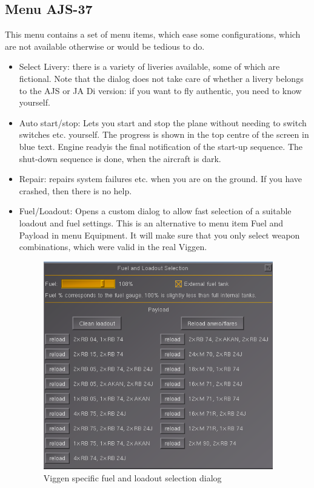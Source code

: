 \subsection{Menu AJS-37}
This menu contains a set of menu items, which ease some configurations, which are not available otherwise or would be tedious to do.
\begin{itemize}
\item Select Livery: there is a variety of liveries available, some of which are fictional. Note that the dialog does not take care of whether a livery belongs to the AJS or JA Di version: if you want to fly authentic, you need to know yourself.
\item Auto start/stop: Lets you start and stop the plane without needing to switch switches etc. yourself. The progress is shown in the top centre of the screen in blue text. \glqq Engine ready\grqq is the final notification of the start-up sequence. The shut-down sequence is done, when the aircraft is dark.
\item Repair: repairs system failures etc. when you are on the ground. If you have crashed, then there is no help.
\item Fuel/Loadout: Opens a custom dialog to allow fast selection of a suitable loadout and fuel settings. This is an alternative to menu item Fuel and Payload in menu Equipment. It will make sure that you only select weapon combinations, which were valid in the real Viggen.

\begin{figure}[h]
\centering
 \includegraphics[width=10cm]{images/fg_loadout_dialog.png}
 \caption{Viggen specific fuel and loadout selection dialog}
\end{figure}


\end{itemize}
